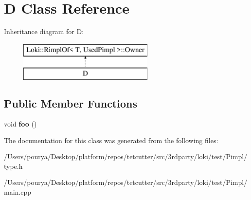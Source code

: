 \hypertarget{classD}{}\section{D Class Reference}
\label{classD}
Inheritance diagram for D\+:\begin{figure}[H]
\begin{center}
\leavevmode
\includegraphics[height=2.000000cm]{classD}
\end{center}
\end{figure}
\subsection*{Public Member Functions}
\begin{DoxyCompactItemize}
\item 
\hypertarget{classD_a772a714c1736d2ae37b0582d3578c657}{}void {\bfseries foo} ()\label{classD_a772a714c1736d2ae37b0582d3578c657}

\end{DoxyCompactItemize}


The documentation for this class was generated from the following files\+:\begin{DoxyCompactItemize}
\item 
/\+Users/pourya/\+Desktop/platform/repos/tetcutter/src/3rdparty/loki/test/\+Pimpl/type.\+h\item 
/\+Users/pourya/\+Desktop/platform/repos/tetcutter/src/3rdparty/loki/test/\+Pimpl/main.\+cpp\end{DoxyCompactItemize}
